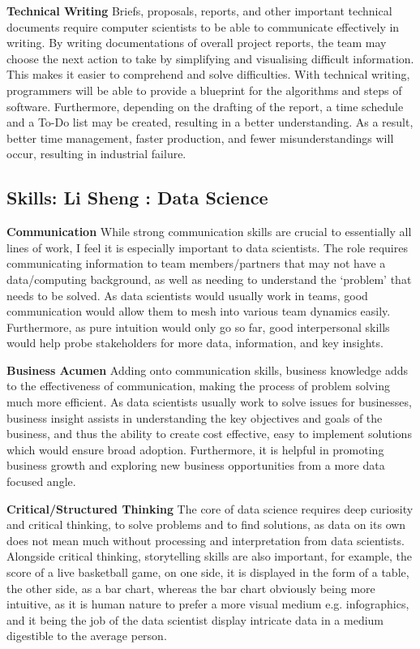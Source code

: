 \documentclass[a4paper, 11pt]{report}
\begin{document}
\textbf{Technical Writing}
  Briefs, proposals, reports, and other important technical documents require computer scientists to be able to communicate effectively in writing. By writing documentations of overall project reports, the team may choose the next action to take by simplifying and visualising difficult information. This makes it easier to comprehend and solve difficulties. With technical writing, programmers will be able to provide a blueprint for the algorithms and steps of software. Furthermore, depending on the drafting of the report, a time schedule and a To-Do list may be created, resulting in a better understanding. As a result, better time management, faster production, and fewer misunderstandings will occur, resulting in industrial failure.


\subsection{Skills: Li Sheng : Data Science}


\textbf{Communication}
While strong communication skills are crucial to essentially all lines of work, I feel it is especially important to data scientists. The role requires communicating information to team members/partners that may not have a data/computing background, as well as needing to understand the ‘problem’ that needs to be solved. As data scientists would usually work in teams, good communication would allow them to mesh into various team dynamics easily. Furthermore, as pure intuition would only go so far, good interpersonal skills would help probe stakeholders for more data, information, and key insights.

\textbf{Business Acumen}
Adding onto communication skills, business knowledge adds to the effectiveness of communication, making the process of problem solving much more efficient. As data scientists usually work to solve issues for businesses, business insight assists in understanding the key objectives and goals of the business, and thus the ability to create cost effective, easy to implement solutions which would ensure broad adoption. Furthermore, it is helpful in promoting business growth and exploring new business opportunities from a more data focused angle.

\textbf{Critical/Structured Thinking}
The core of data science requires deep curiosity and critical thinking, to solve problems and to find solutions, as data on its own does not mean much without processing and interpretation from data scientists. Alongside critical thinking, storytelling skills are also important, for example, the score of a live basketball game, on one side, it is displayed in the form of a table, the other side, as a bar chart, whereas the bar chart obviously being more intuitive, as it is human nature to prefer a more visual medium e.g. infographics, and it being the job of the data scientist display intricate data in a medium digestible to the average person.
\end{document}

